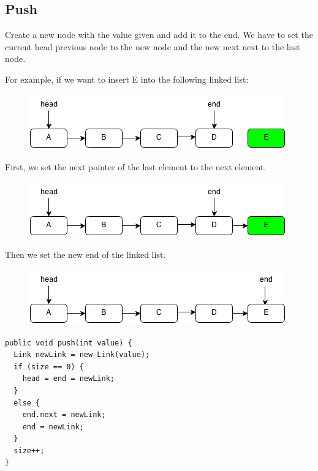 \documentclass[11pt,oneside]{book}
\makeatletter
\def\maxwidth#1{\ifdim\Gin@nat@width>#1 #1\else\Gin@nat@width\fi}
\makeatother
\begin{document}
\subsection{Push}

Create a new node with the value given and add it to the end. We have to set the current head previous node to the new node and the new next next to the last node.

For example, if we want to insert E into the following linked list:

\vspace{5px}\begin{figure}[H]\centering
        \includegraphics[width=0.66\maxwidth{\textwidth}]{linkedlistpush.png}
        \end{figure}

First, we set the next pointer of the last element to the next element.

\vspace{5px}\begin{figure}[H]\centering
        \includegraphics[width=0.66\maxwidth{\textwidth}]{linkedlistpush2.png}
        \end{figure}

Then we set the new end of the linked list.

\vspace{5px}\begin{figure}[H]\centering
        \includegraphics[width=0.66\maxwidth{\textwidth}]{linkedlistpush3.png}
        \end{figure}

\begin{lstlisting}
public void push(int value) {
  Link newLink = new Link(value);
  if (size == 0) {
    head = end = newLink;
  }
  else {
    end.next = newLink;
    end = newLink;
  }
  size++;
}
\end{lstlisting}
\end{document}
